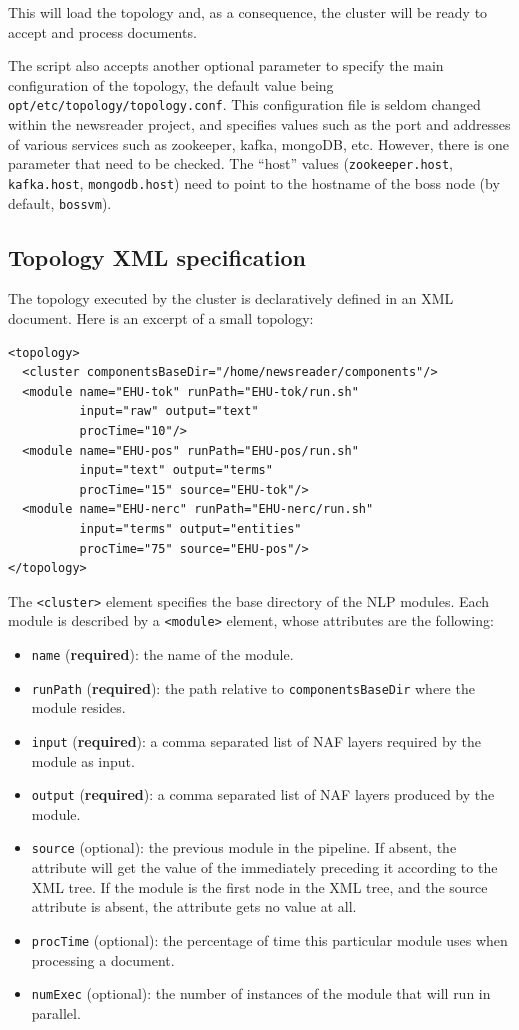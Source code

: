 \documentclass[a4]{article}
\begin{document}
This will load the topology and, as a consequence, the cluster will be ready
to accept and process documents.

The script also accepts another optional parameter to specify the main
configuration of the topology, the default value being
\texttt{opt/etc/topology/topology.conf}. This configuration file is seldom
changed within the newsreader project, and specifies values such as the port
and addresses of various services such as zookeeper, kafka, mongoDB,
etc. However, there is one parameter that need to be checked. The ``host''
values (\texttt{zookeeper.host}, \texttt{kafka.host}, \texttt{mongodb.host})
need to point to the hostname of the boss node (by default, \texttt{bossvm}).

\subsection{Topology XML specification}
\label{sec:topol-xml-spec}

The topology executed by the cluster is declaratively defined in an XML
document. Here is an excerpt of a small topology:

\begin{lstlisting}
<topology>
  <cluster componentsBaseDir="/home/newsreader/components"/>
  <module name="EHU-tok" runPath="EHU-tok/run.sh"
          input="raw" output="text"
          procTime="10"/>
  <module name="EHU-pos" runPath="EHU-pos/run.sh"
          input="text" output="terms"
          procTime="15" source="EHU-tok"/>
  <module name="EHU-nerc" runPath="EHU-nerc/run.sh"
          input="terms" output="entities"
          procTime="75" source="EHU-pos"/>
</topology>
\end{lstlisting}

The \texttt{<cluster>} element specifies the base directory of the NLP
modules. Each module is described by a \texttt{<module>} element, whose
attributes are the following:

\begin{itemize}
\item \texttt{name} (\textbf{required}): the name of the module.
\item \texttt{runPath} (\textbf{required}): the path relative to \texttt{componentsBaseDir}
  where the module resides.
\item \texttt{input} (\textbf{required}): a comma separated list of NAF layers required by the
  module as input.
\item \texttt{output} (\textbf{required}): a comma separated list of NAF layers produced by the
  module.
\item \texttt{source} (optional): the previous module in the pipeline. If
  absent, the attribute will get the value of the immediately preceding it
  according to the XML tree. If the module is the first node in the XML
  tree, and the source attribute is absent, the attribute gets no value at
  all.
\item \texttt{procTime} (optional): the percentage of time this particular
  module uses when processing a document.
\item \texttt{numExec} (optional): the number of instances of the module
  that will run in parallel.
\end{itemize}
\end{document}
